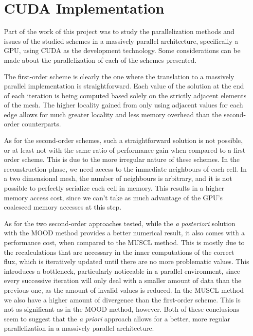 \section{CUDA Implementation}
\label{sec:600}

Part of the work of this project was to study the parallelization methods and issues of the studied schemes in a massively parallel architecture, specifically a GPU, using CUDA as the development technology. Some considerations can be made about the parallelization of each of the schemes presented.

The first-order scheme is clearly the one where the translation to a massively parallel implementation is straightforward. Each value of the solution at the end of each iteration is being computed based solely on the strictly adjacent elements of the mesh. The higher locality gained from only using adjacent values for each edge allows for much greater locality and less memory overhead than the second-order counterparts.

As for the second-order schemes, such a straightforward solution is not possible, or at least not with the same ratio of performance gain when compared to a first-order scheme. This is due to the more irregular nature of these schemes.
In the reconstruction phase, we need access to the immediate neighbours of each cell. In a two dimensional mesh, the number of neighbours is arbitrary, and it is not possible to perfectly serialize each cell in memory. This results in a higher memory access cost, since we can't take as much advantage of the GPU's coalesced memory accesses at this step.

As for the two second-order approaches tested, while the {\it a posteriori} solution with the MOOD method provides a better numerical result, it also comes with a performance cost, when compared to the MUSCL method. This is mostly due to the recalculations that are necessary in the inner computations of the correct flux, which is iteratively updated until there are no more problematic values. This introduces a bottleneck, particularly noticeable in a parallel environment, since every successive iteration will only deal with a smaller amount of data than the previous one, as the amount of invalid values is reduced.
In the MUSCL method we also have a higher amount of divergence than the first-order scheme. This is not as significant as in the MOOD method, however.
Both of these conclusions seem to suggest that the {\it a priori} approach allows for a better, more regular parallelization in a massively parallel architecture.


